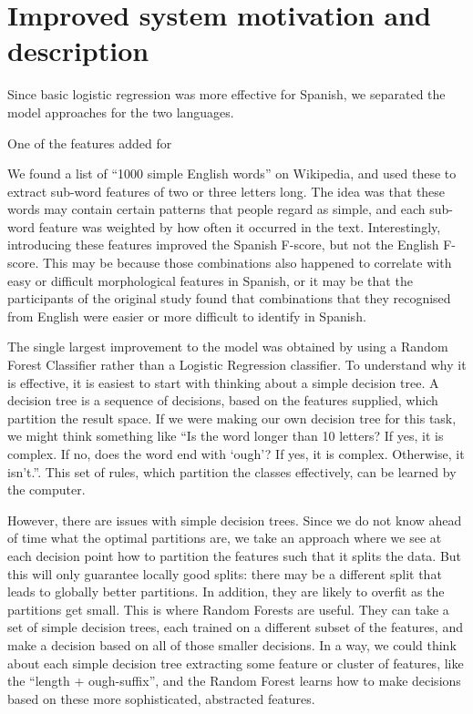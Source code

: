 \documentclass[11pt,a4paper]{article}
\begin{document}
\section{Improved system motivation and description}

Since basic logistic regression was more effective for Spanish, we separated the model approaches for the two languages.

One of the features added for 

We found a list of \enquote{1000 simple English words} on Wikipedia, and used these to extract sub-word features of two or three letters long. The idea was that these words may contain certain patterns that people regard as simple, and each sub-word feature was weighted by how often it occurred in the text. Interestingly, introducing these features improved the Spanish F-score, but not the English F-score. This may be because those combinations also happened to correlate with easy or difficult morphological features in Spanish, or it may be that the participants of the original study found that combinations that they recognised from English were easier or more difficult to identify in Spanish.

The single largest improvement to the model was obtained by using a Random Forest Classifier rather than a Logistic Regression classifier. To understand why it is effective, it is easiest to start with thinking about a simple decision tree. A decision tree is a sequence of decisions, based on the features supplied, which partition the result space. If we were making our own decision tree for this task, we might think something like \enquote{Is the word longer than 10 letters? If yes, it is complex. If no, does the word end with \enquote{ough}? If yes, it is complex. Otherwise, it isn't.}. This set of rules, which partition the classes effectively, can be learned by the computer. 

However, there are issues with simple decision trees. Since we do not know ahead of time what the optimal partitions are, we take an approach where we see at each decision point how to partition the features such that it splits the data. But this will only guarantee locally good splits: there may be a different split that leads to globally better partitions. In addition, they are likely to overfit as the partitions get small. This is where Random Forests are useful. They can take a set of simple decision trees, each trained on a different subset of the features, and make a decision based on all of those smaller decisions. In a way, we could think about each simple decision tree extracting some feature or cluster of features, like the \enquote{length + ough-suffix}, and the Random Forest learns how to make decisions based on these more sophisticated, abstracted features. 
\end{document}
